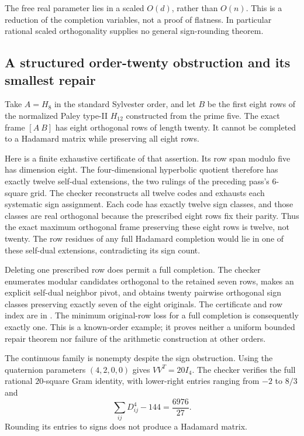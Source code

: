 The free real parameter lies in a scaled $O(d)$, rather than $O(n)$.
This is a reduction of the completion variables, not a proof of
flatness. In particular rational scaled orthogonality supplies no
general sign-rounding theorem.

\subsection{A structured order-twenty obstruction and its smallest repair}
Take $A=H_8$ in the standard Sylvester order, and let $B$ be the
first eight rows of the normalized Paley type-II $H_{12}$ constructed
from the prime five. The exact frame $[A\ B]$ has eight orthogonal
rows of length twenty. It cannot be completed to a Hadamard matrix
while preserving all eight rows.

Here is a finite exhaustive certificate of that assertion.
Its row span modulo five has dimension eight. The four-dimensional
hyperbolic quotient therefore has exactly twelve self-dual
extensions, the two rulings of the preceding pass's $6$-square grid.
The checker reconstructs all twelve codes and exhausts each
systematic sign assignment. Each code has exactly twelve sign
classes, and those classes are real orthogonal because the
prescribed eight rows fix their parity. Thus the exact maximum
orthogonal frame preserving these eight rows is twelve, not twenty.
The row residues of any full Hadamard completion would lie in one
of these self-dual extensions, contradicting its sign count.

Deleting one prescribed row does permit a full completion.
The checker enumerates modular candidates orthogonal to the retained
seven rows, makes an explicit self-dual neighbor pivot, and obtains
twenty pairwise orthogonal sign classes preserving exactly seven of
the eight originals. The certificate and row index are in
. The minimum original-row loss for a
full completion is consequently exactly one.
This is a known-order example; it proves neither a uniform bounded
repair theorem nor failure of the arithmetic construction at other orders.

The continuous family is nonempty despite the sign obstruction.
Using the quaternion parameters $(4,2,0,0)$ gives $VV^T=20I_4$.
The checker verifies the full rational $20$-square Gram identity,
with lower-right entries ranging from $-2$ to $8/3$ and
\[
                    \sum_{ij}D_{ij}^4-144=\frac{6976}{27}.
\]
Rounding its entries to signs does not produce a Hadamard matrix.

